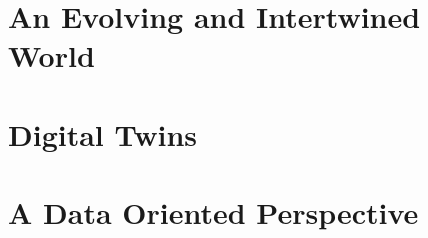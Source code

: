 \chapter{An Evolving and Intertwined World}
\label{chap:evolving_intertwined_world}



\chapter{Digital Twins}
\label{chap:digital_twins}


\chapter{A Data Oriented Perspective}
\label{chap:data_oriented_perspective}



